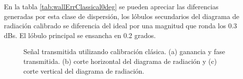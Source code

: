 En la tabla \ref{tab:wallErrClassical0deg} se pueden apreciar las diferencias generadas por esta clase de dispersión, los 
lóbulos secundarios del diagrama de radiación calibrado se diferencia del ideal por una magnitud que ronda los 0.3 dBs. El 
lóbulo principal se ensancha en 0.2 grados.

\begin{figure}[H]
	\centering

	\caption{Señal transmitida utilizando calibración clásica. (a) ganancia y fase transmitida. (b) corte horizontal del 
	diagrama de radiación y (c) corte vertical del diagrama de radiación.}
	\label{fig:wallErrClassical0deg}
\end{figure}

